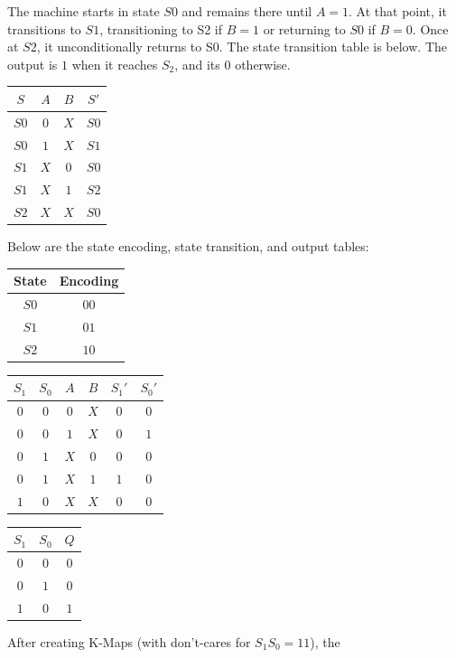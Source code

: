 \documentclass[12pt]{article}
\newenvironment{sol}[1][Solution]{\begin{trivlist}
		\item[\hskip \labelsep {\bfseries #1:}]}{\end{trivlist}}
\begin{document}
\begin{sol}
	The machine starts in state $S0$ and remains there until $A=1$.  At that point, it transitions to $S1$,
	transitioning to S2 if $B=1$ or returning to $S0$ if $B=0$. Once at $S2$, it unconditionally returns to S0.
	The state transition table is below. The output is $1$ when it reaches $S_2$, and its 0 otherwise.
	\begin{center}
		\begin{tabular}{c|cc|c}
			$S$ & $A$ & $B$ & $S'$\\
			\hline
			$S0$ & $0$ & $X$ & $S0$\\
			$S0$ & $1$ & $X$ & $S1$\\
			$S1$ & $X$ & $0$ & $S0$\\
			$S1$ & $X$ & $1$ & $S2$\\
			$S2$ & $X$ & $X$ & $S0$\\
		\end{tabular}
	\end{center}
	Below are the state encoding, state transition, and output tables:
	\begin{center}
		\begin{tabular}{c|c}
			State & Encoding\\
			\hline
			$S0$ & $00$\\
			$S1$ & $01$\\
			$S2$ & $10$\\
		\end{tabular}
		\quad
		\begin{tabular}{cc|cc|cc}
			$S_1$ & $S_0$ & $A$ & $B$ & $S_1'$ & $S_0'$\\
			\hline
			$0$ & $0$ & $0$ & $X$ & $0$ & $0$\\
			$0$ & $0$ & $1$ & $X$ & $0$ & $1$\\
			$0$ & $1$ & $X$ & $0$ & $0$ & $0$\\
			$0$ & $1$ & $X$ & $1$ & $1$ & $0$\\
			$1$ & $0$ & $X$ & $X$ & $0$ & $0$\\
		\end{tabular}
		\quad 
		\begin{tabular}{cc|c}
			$S_1$ & $S_0$ & $Q$\\
			\hline
			$0$ & $0$ & $0$\\
			$0$ & $1$ & $0$\\
			$1$ & $0$ & $1$\\
		\end{tabular}
	\end{center}
	After creating K-Maps (with don't-cares for $S_1S_0=11$), the

\end{sol}
\end{document}
